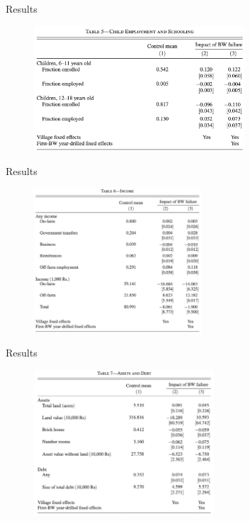 \documentclass[10pt]{beamer}
\begin{document}
\begin{frame}
	{Results}
	\begin{figure}
		\centering
		\includegraphics[width=0.7\textwidth]{table5.png}
	\end{figure}
\end{frame}

\begin{frame}
	{Results}
	\begin{figure}
		\centering
		\includegraphics[width=0.56\textwidth]{table6.png}
	\end{figure}
\end{frame}
\begin{frame}
	{Results}
	\begin{figure}
		\centering
		\includegraphics[width=0.6\textwidth]{table7.png}
	\end{figure}
\end{frame}
\end{document}
